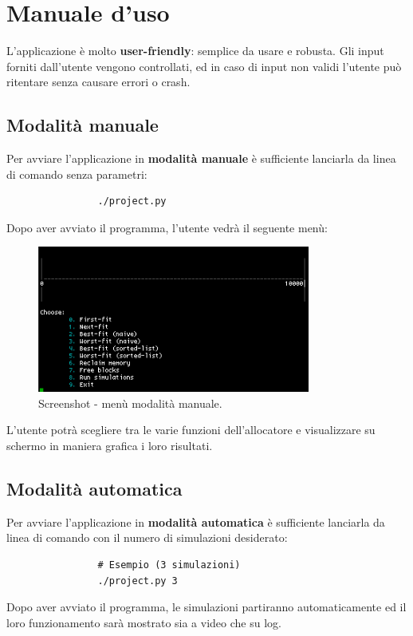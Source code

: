 \documentclass[12pt]{report}
\renewcommand\emph{\textbf}
\begin{document}
    \section{Manuale d'uso}

        L'applicazione è molto \emph{user-friendly}: semplice da usare e robusta. Gli input forniti dall'utente vengono controllati, ed in caso di input non validi l'utente può ritentare senza causare errori o crash.

        \subsection{Modalità manuale}

            Per avviare l'applicazione in \emph{modalità manuale} è sufficiente lanciarla da linea di comando senza parametri:

            \begin{verbatim}
                ./project.py
            \end{verbatim}

            Dopo aver avviato il programma, l'utente vedrà il seguente menù:

            \begin{figure}[H]
                \caption{Screenshot - menù modalità manuale.}
                \centering
                \includegraphics[width=0.8\textwidth]{scr1}
            \end{figure}

            L'utente potrà scegliere tra le varie funzioni dell'allocatore e visualizzare su schermo in maniera grafica i loro risultati.

        \subsection{Modalità automatica}

            Per avviare l'applicazione in \emph{modalità automatica} è sufficiente lanciarla da linea di comando con il numero di simulazioni desiderato:

            \begin{verbatim}
                # Esempio (3 simulazioni) 
                ./project.py 3
            \end{verbatim}

            Dopo aver avviato il programma, le simulazioni partiranno automaticamente ed il loro funzionamento sarà mostrato sia a video che su log.
\end{document}
